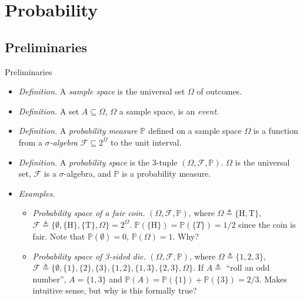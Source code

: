\documentclass{beamer}
\begin{document}
\section{Probability}

\subsection{Preliminaries}

\begin{frame}{Preliminaries}
    \begin{itemize}
        \item
        \textit{Definition.} A \textit{sample space} is the universal set
        $ \Omega $ of outcomes.

        \item
        \textit{Definition.} A set $ A \subseteq \Omega $, $ \Omega $ a sample
        space, is an \textit{event}.

        \item
        \textit{Definition.} A \textit{probability measure} $ \mathbb{P} $
        defined on a sample space $ \Omega $ is a function from a
        $ \sigma $\textit{-algebra} $ \mathcal{F} \subseteq 2^\Omega $ to the
        unit interval.

        \item
        \textit{Definition.} A \textit{probability space} is the 3-tuple
        $ (\Omega, \mathcal{F}, \mathbb{P}) $. $ \Omega $ is the universal set,
        $ \mathcal{F} $ is a $ \sigma $-algebra, and $ \mathbb{P} $ is a
        probability measure.

        \item
        \textit{Examples.}
        \begin{itemize}
            \item
            \textit{Probability space of a fair coin.}
            $ (\Omega, \mathcal{F}, \mathbb{P}) $, where $ \Omega \triangleq
            \{\text{H}, \text{T}\} $, $ \mathcal{F} \triangleq \{\emptyset,
            \{\text{H}\}, \{\text{T}\}, \Omega\} = 2^\Omega $.
            $ \mathbb{P}(\{\text{H}\}) = \mathbb{P}(\{T\}) = 1 / 2 $ since the
            coin is fair. Note that $ \mathbb{P}(\emptyset) = 0 $,
            $ \mathbb{P}(\Omega) = 1 $. Why?

            \item
            \textit{Probability space of 3-sided die.} $ (\Omega, \mathcal{F},
            \mathbb{P}) $, where $ \Omega \triangleq \{1, 2, 3\} $,
            $ \mathcal{F} \triangleq \{\emptyset, \{1\}, \{2\}, \{3\},
            \{1, 2\}, \{1, 3\}, \{2, 3\}, \Omega\} $. If $ A \triangleq $
            ``roll an odd number'', $ A = \{1, 3\} $ and
            $ \mathbb{P}(A) = \mathbb{P}(\{1\}) + \mathbb{P}(\{3\}) = 2 / 3 $.
            Makes intuitive sense, but why is this formally true?
        \end{itemize}
    \end{itemize}
\end{frame}
\end{document}
